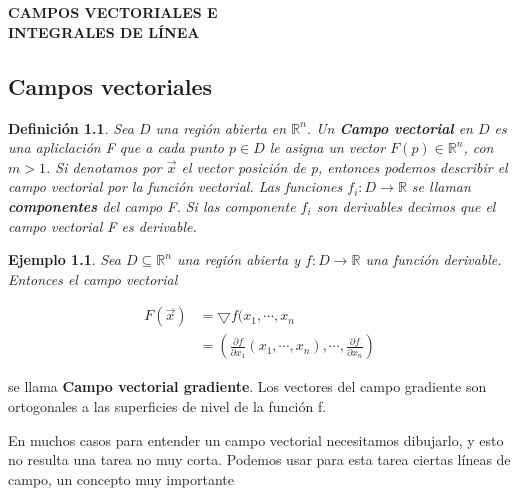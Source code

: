 \documentclass[12pt]{book}
\numberwithin{equation}{section}
\theoremstyle{plain}  %
\newtheorem{Def}{Definición}[chapter]
\newtheorem{Ej}{Ejemplo}[chapter]
\begin{document}
\chapter{}

\noindent \textbf{{\huge CAMPOS VECTORIALES E\\
INTEGRALES DE LÍNEA}}

\section{Campos vectoriales}

\begin{Def}
{\it
Sea $D$ una región abierta en $\mathbb{R}^{n}$. Un \textbf{Campo vectorial} en $D$ es una apliclación F que a cada punto $p \in D$ le asigna un vector $F(p) \in \mathbb{R}^{n}$, con $m>1$. Si denotamos por $\vec{x}$ el vector posición de p, entonces podemos describir el campo vectorial por la función vectorial. Las funciones $f_{i}: D \to \mathbb{R}$ se llaman \textbf{componentes} del campo F. Si las componente $f_{i}$ son derivables decimos que el campo vectorial F es derivable. 

}
\end{Def}
{\it
\begin{Ej}

Sea $D \subseteq \mathbb{R}^{n}$ una región abierta y $f: D \to \mathbb{R}$ una función derivable. Entonces el campo  vectorial 


\begin{align*}
	F(\vec{x})&=\bigtriangledown f(x_{1},\cdots,x_{n}\\
	&=(\frac{\partial f}{\partial x_{1}}(x_{1},\cdots,x_{n}),\cdots,\frac{\partial f}{\partial x_{n}})
\end{align*}

\end{Ej}
\noindent se llama \textbf{Campo vectorial gradiente}. Los vectores del campo gradiente son ortogonales a las superficies de nivel de la función f.
}
\vfill
En muchos casos para entender un campo vectorial necesitamos dibujarlo, y esto no resulta una tarea no muy corta. Podemos usar para esta tarea ciertas líneas de campo, un concepto muy importante
\newpage
\end{document}
